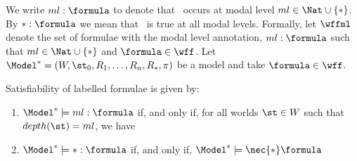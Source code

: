We write $ml: \formula$ to denote that \formula~occurs at modal level $ml\in
\Nat \cup \{*\}$. By $*: \formula$ we mean that \formula~is true at
all modal levels. Formally, let $\wffml$ denote the set of formulae with
the modal level annotation, $ml : \formula$ such that $ml \in \Nat \cup \{*\}$
and $\formula \in \wff$. Let $\Model^* = (W, \st_0, R_1, \ldots, R_n, R_*, \pi)$
be a model and take $\formula \in \wff$. 

\begin{definition}
Satisfiability of labelled formulae is given by:

\begin{enumerate}
    \item $\Model^* \models ml : \formula$ if, and only if, for all worlds
        $\st \in W$ such that $depth(\st) = ml$, we have
        \sat{\Model^*}{\st}{\formula} 
    \item $\Model^* \models * : \formula$ if, and only if, $\Model^* \models
        \nec{*} \formula$
\end{enumerate}
    
\end{definition}
